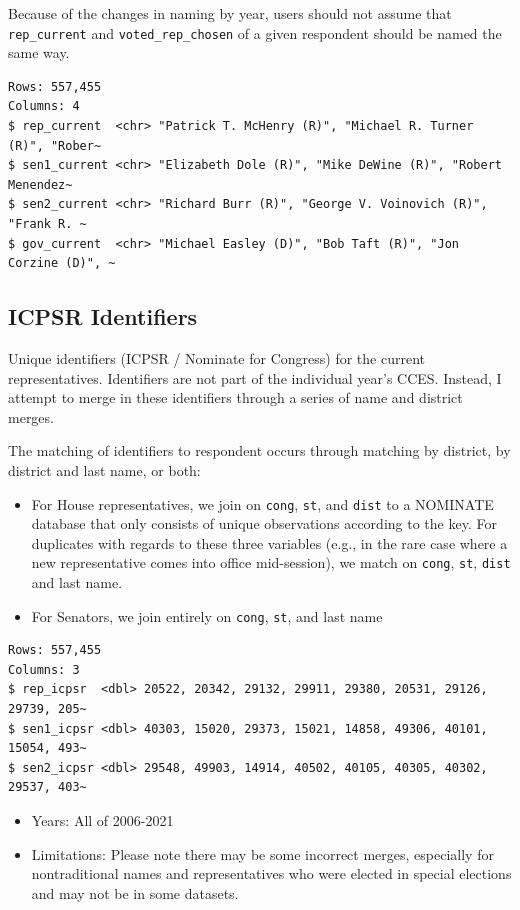 \documentclass[10pt,article,oneside]{memoir}
\theoremstyle{definition}
\begin{document}
Because of the changes in naming by year, users should not assume that
\texttt{rep\_current} and \texttt{voted\_rep\_chosen} of a given
respondent should be named the same way.

\begin{verbatim}
Rows: 557,455
Columns: 4
$ rep_current  <chr> "Patrick T. McHenry (R)", "Michael R. Turner (R)", "Rober~
$ sen1_current <chr> "Elizabeth Dole (R)", "Mike DeWine (R)", "Robert Menendez~
$ sen2_current <chr> "Richard Burr (R)", "George V. Voinovich (R)", "Frank R. ~
$ gov_current  <chr> "Michael Easley (D)", "Bob Taft (R)", "Jon Corzine (D)", ~
\end{verbatim}

\hypertarget{icpsr-identifiers}{%
\subsection{ICPSR Identifiers}\label{icpsr-identifiers}}

Unique identifiers (ICPSR / Nominate for Congress) for the current
representatives. Identifiers are not part of the individual year's CCES.
Instead, I attempt to merge in these identifiers through a series of
name and district merges.

The matching of identifiers to respondent occurs through matching by
district, by district and last name, or both:

\begin{itemize}
\tightlist
\item
  For House representatives, we join on \texttt{cong}, \texttt{st}, and
  \texttt{dist} to a NOMINATE database that only consists of unique
  observations according to the key. For duplicates with regards to
  these three variables (e.g., in the rare case where a new
  representative comes into office mid-session), we match on
  \texttt{cong}, \texttt{st}, \texttt{dist} and last name.
\item
  For Senators, we join entirely on \texttt{cong}, \texttt{st}, and last
  name
\end{itemize}

\begin{verbatim}
Rows: 557,455
Columns: 3
$ rep_icpsr  <dbl> 20522, 20342, 29132, 29911, 29380, 20531, 29126, 29739, 205~
$ sen1_icpsr <dbl> 40303, 15020, 29373, 15021, 14858, 49306, 40101, 15054, 493~
$ sen2_icpsr <dbl> 29548, 49903, 14914, 40502, 40105, 40305, 40302, 29537, 403~
\end{verbatim}

\begin{itemize}
\tightlist
\item
  Years: All of 2006-2021
\item
  Limitations: Please note there may be some incorrect merges,
  especially for nontraditional names and representatives who were
  elected in special elections and may not be in some datasets.
\end{itemize}
\end{document}
